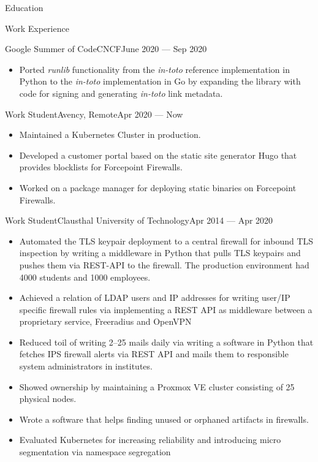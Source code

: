 \documentclass[]{mcdowellcv}
\begin{document}
\begin{cvsection}{Education}
\begin{cvsection}{Work Experience}
\begin{cvsubsection}{Google Summer of Code}{CNCF}{June 2020 --- Sep 2020}
\begin{itemize}
\item Ported \textit{runlib} functionality from the \textit{in-toto} reference implementation in Python to the \textit{in-toto} implementation in Go by expanding the library with code for signing and generating \textit{in-toto} link metadata.
\end{itemize}
\end{cvsubsection}
\begin{cvsubsection}{Work Student}{Avency, Remote}{Apr 2020 --- Now}
\begin{itemize}
\item Maintained a Kubernetes Cluster in production.
\item Developed a customer portal based on the static site generator Hugo that provides blocklists for Forcepoint Firewalls.
\item Worked on a package manager for deploying static binaries on Forcepoint Firewalls.
\end{itemize}
\end{cvsubsection}
\begin{cvsubsection}{Work Student}{Clausthal University of Technology}{Apr 2014 --- Apr 2020}
\bigskip
\begin{itemize}
\item Automated the TLS keypair deployment to a central firewall for inbound TLS inspection by writing a middleware in Python that pulls TLS keypairs and pushes them via REST-API to the firewall. The production environment had 4000 students and 1000 employees.
\item Achieved a relation of LDAP users and IP addresses for writing user/IP specific firewall rules via implementing
a REST API as middleware between a proprietary service, Freeradius and OpenVPN
\item Reduced toil of writing 2--25 mails daily via writing a software in Python that fetches IPS firewall alerts via REST API and mails them
to responsible system administrators in institutes.
\item Showed ownership by maintaining a Proxmox VE cluster consisting of 25 physical nodes.
\item Wrote a software that helps finding unused or orphaned artifacts in firewalls.
\item Evaluated Kubernetes for increasing reliability and introducing micro segmentation via namespace segregation
\end{itemize}
\end{cvsubsection}
\end{cvsection}


\end{cvsection}
\end{document}
